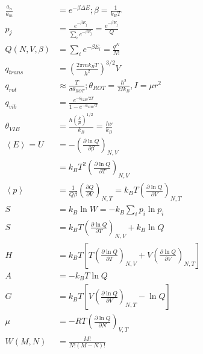 \begin{align*}
\frac{a_n}{a_m} &= e^{-\beta\Delta E}; \beta=\frac{1}{k_BT}\\
p_j&=\frac{e^{-\beta E_j}}{\sum_ie^{-\beta E_j}}=\frac{e^{-\beta E_j}}{Q}\\
Q\left(N,V,\beta\right)&=\sum_ie^{-\beta E_i}=\frac{q^N}{N!}\\
q_{trans}&=\left(\frac{2\pi m k_B T}{h^2}\right)^{3/2}V\\
q_{rot}&\approx \frac{T}{\sigma\theta_{ROT}}; \theta_{ROT}=\frac{\hbar^2}{2Ik_B}, I=\mu r^2\\
q_{vib}&=\frac{e^{-\theta_{VIB}/2T}}{1-e^{-\theta_{VIB}/T}}\\
\theta_{VIB}&=\frac{\hbar\left(\frac{k}{\mu}\right)^{1/2}}{k_B}=\frac{h\nu}{k_B}\\
\left<E\right>=U&=-\left(\frac{\partial \ln{Q}}{\partial{\beta}}\right)_{N,V}\\
&=k_BT^2\left(\frac{\partial \ln{Q}}{\partial{T}}\right)_{N,V}\\
\left<p\right>&=\frac{1}{Q\beta}\left(\frac{\partial Q}{\partial V}\right)_{N,T}=k_BT\left(\frac{\partial \ln{Q}}{\partial{V}}\right)_{N,T}\\
S&=k_B\ln{W}=-k_B \sum_{i}p_i\ln p_i\\
S&=k_BT\left(\frac{\partial \ln{Q}}{\partial{T}}\right)_{N,V}+k_B\ln{Q}\\
H&=k_BT\left[T\left(\frac{\partial \ln Q}{\partial T}\right)_{N,V} + V\left(\frac{\partial \ln Q}{\partial V}\right)_{N,T}\right]\\
A&=-k_BT\ln Q\\
G &= k_BT\left[V\left(\frac{\partial \ln Q}{\partial V}\right)_{N,T}-\ln Q\right]\\
\mu&=-RT\left(\frac{\partial \ln Q}{\partial N}\right)_{V,T}\\
W(M,N) &= \frac{M!}{N!(M-N)!}\\
\end{align*}
